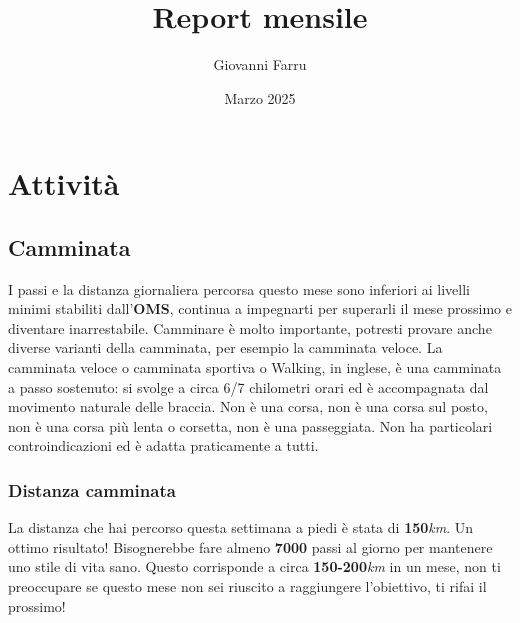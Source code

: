 \documentclass{article}
\title{Report mensile}
\author{Giovanni Farru}
\date{Marzo 2025}
\begin{document}
\tableofcontents

\newpage

\maketitle

\section{Attività}

\subsection{Camminata}
\begin{center}
\end{center}
I passi e la distanza giornaliera percorsa questo mese sono inferiori ai livelli minimi stabiliti dall'\textbf{OMS}, continua a impegnarti per superarli il mese prossimo e diventare inarrestabile. Camminare è molto importante, potresti provare anche diverse varianti della camminata, per esempio la camminata veloce. La camminata veloce o camminata sportiva o Walking, in inglese, è una camminata a passo sostenuto: si svolge a circa 6/7 chilometri orari ed è accompagnata dal movimento naturale delle braccia. Non è una corsa, non è una corsa sul posto, non è una corsa più lenta o corsetta, non è una passeggiata. Non ha particolari controindicazioni ed è adatta praticamente a tutti. 

\subsubsection{Distanza camminata}
La distanza che hai percorso questa settimana a piedi è stata di \textbf{150}\textit{km}.
Un ottimo risultato! 
Bisognerebbe fare almeno \textbf{7000} passi al giorno per mantenere uno stile di vita sano. Questo corrisponde a circa \textbf{150-200}\textit{km} in un mese, non ti preoccupare se questo mese non sei riuscito a raggiungere l'obiettivo, ti rifai il prossimo! 
\end{document}
